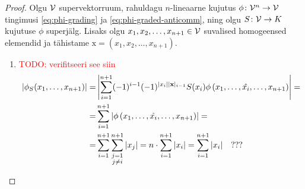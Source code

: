 \begin{proof}
    Olgu $\mathcal{V}$ supervektorruum, rahuldagu $n$-lineaarne
    kujutus $\phi \colon \mathcal{V}^n \to \mathcal{V}$ tingimusi
    \eqref{eq:phi-grading} ja \eqref{eq:phi-graded-anticomm}, ning
    olgu $S \colon \mathcal{V} \to K$ kujutuse $\phi$ superjälg. Lisaks olgu
    $x_1, x_2, \dots, x_{n+1} \in \mathcal{V}$ suvalised homogeensed elemendid
    ja tähistame $\mathrm{x} = (x_1, x_2, \dots, x_{n+1})$.
    \begin{enumerate}[label=\arabic*)]
        \item \textcolor{red}{TODO: verifitseeri see siin
            \begin{align*}
                | \phi_S (x_1, \dots, x_{n+1}) | =&
                \left |
                    \sum_{i=1}^{n+1} (-1)^{i-1}(-1)^{
                        |x_i| |\mathbf{x}|_{i-1}
                    } S(x_i) \phi \left(
                        x_1, \dots, \hat{x_i}, \dots, x_{n+1}
                    \right)
                \right| = \\
                =& \sum_{i=1}^{n+1} \left|
                    \phi \left( x_1, \dots, \hat{x_i}, \dots, x_{n+1} \right)
                \right| = \\
                =& \sum_{i=1}^{n+1} \sum_{\mathclap{
                        \substack{j=1\\j \ne i}}
                }^{n+1} |x_j| = n \cdot \sum_{i=1}^{n+1} |x_i| =
                \sum_{i=1}^{n+1} |x_i| \quad ???
            \end{align*}
        }


\end{enumerate}
\end{proof}

